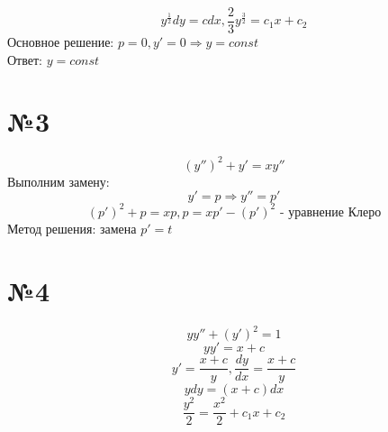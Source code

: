 \documentclass{article}
\begin{document}
\begin{equation*}
    y^{\frac{1}{2}}dy = cdx, \frac{2}{3}y^{\frac{3}{2}} = c_1x + c_2
\end{equation*}
Основное решение:
$p = 0, y' = 0 \Rightarrow y = const$\\
Ответ: $ y = const$

\section*{№3}
\begin{equation*}
    (y'')^2 + y' = xy''
\end{equation*}
Выполним замену:
\begin{equation*}
    y' = p \Rightarrow y'' = p'
\end{equation*}
\begin{equation*}
    (p')^2 + p = xp, p = xp' - (p')^2 \text{ - уравнение Клеро}
\end{equation*}
Метод решения:  замена  $p' = t$

\section*{№4}
\begin{equation*}
    yy'' + (y')^2 = 1
\end{equation*}
\begin{equation*}
    yy' = x + c
\end{equation*}
\begin{equation*}
    y' = \frac{x + c}{y}, \frac{dy}{dx} = \frac{x + c}{y}
\end{equation*}
\begin{equation*}
    ydy = (x + c) dx
\end{equation*}
\begin{equation*}
    \frac{y^2}{2} = \frac{x^2}{2} + c_1x + c_2
\end{equation*}
\end{document}
